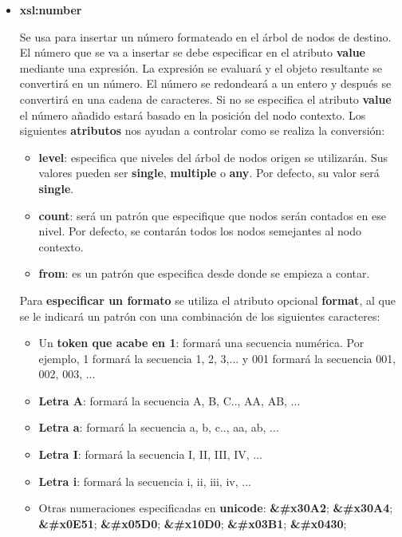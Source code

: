 \begin{itemize}
    \item \textbf{xsl:number}

    Se usa para insertar un número formateado en el árbol de nodos de destino. El número que se va a insertar se debe especificar en el atributo \textbf{value} mediante una expresión. La expresión se evaluará y el objeto resultante se convertirá en un número. El número se redondeará a un entero y después se convertirá en una cadena de caracteres. Si no se especifica el atributo \textbf{value} el número añadido estará basado en la posición del nodo contexto. Los siguientes \textbf{atributos} nos ayudan a controlar como se realiza la conversión:

    \begin{itemize}
        \item \textbf{level}: especifica que niveles del árbol de nodos origen se utilizarán. Sus valores pueden ser \textbf{single}, \textbf{multiple} o \textbf{any}. Por defecto, su valor será \textbf{single}.
        \item \textbf{count}: será un patrón que especifique que nodos serán contados en ese nivel. Por defecto, se contarán todos los nodos semejantes al nodo contexto.
        \item \textbf{from}: es un patrón que especifica desde donde se empieza a contar.
    \end{itemize}

    Para \textbf{especificar un formato} se utiliza el atributo opcional \textbf{format}, al que se le indicará un patrón con una combinación de los siguientes caracteres:

    \begin{itemize}
        \item Un \textbf{token que acabe en 1}: formará una secuencia numérica. Por ejemplo, 1 formará la secuencia 1, 2, 3,... y 001 formará la secuencia 001, 002, 003, ...
        \item \textbf{Letra A}: formará la secuencia A, B, C.., AA, AB, ...
        \item \textbf{Letra a}: formará la secuencia a, b, c.., aa, ab, ...
        \item \textbf{Letra I}: formará la secuencia I, II, III, IV, ...
        \item \textbf{Letra i}: formará la secuencia i, ii, iii, iv, ...
        \item Otras numeraciones especificadas en \textbf{unicode}:  \textbf{\&\#x30A2}; \textbf{\&\#x30A4}; \textbf{\&\#x0E51}; \textbf{\&\#x05D0}; \textbf{\&\#x10D0}; \textbf{\&\#x03B1}; \textbf{\&\#x0430};
    \end{itemize}


\end{itemize}
